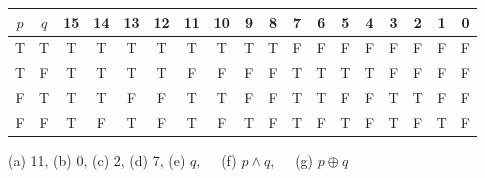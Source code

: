 \documentclass[12pt,addpoints]{exam}
\newcommand{\xor}{\oplus}
\begin{document}
\begin{questions}
\footnotesize
 \begin{tabular}{cc|cccc|cccc|cccc|cccc}
    $p$ & $q$ & 15 & 14 & 13 & 12 & 11 & 10 & 9 & 8 & 7 & 6 & 5 & 4 & 3 & 2 & 1 & 0 \\
    \hline
    T & T & T & T & T & T & T & T & T & T & F & F & F & F & F & F & F & F \\
    T & F & T & T & T & T & F & F & F & F & T & T & T & T & F & F & F & F \\
    F & T & T & T & F & F & T & T & F & F & T & T & F & F & T & T & F & F \\
    F & F & T & F & T & F & T & F & T & F & T & F & T & F & T & F & T & F \\
 \end{tabular}
 \normalsize
    \begin{solution} (a) 11, \hspace{0.1in} (b) 0, \hspace{0.1in} (c) 2, \hspace{0.1in} (d) 7, \hspace{0.1in} (e) $q, \quad$ (f) $p \wedge q, \quad$ (g) $p \xor q$
    \end{solution}



\end{questions}
\end{document}
